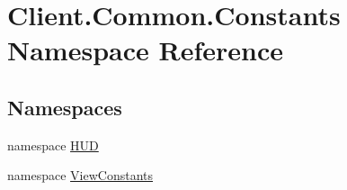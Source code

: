 \hypertarget{namespaceClient_1_1Common_1_1Constants}{}\section{Client.\+Common.\+Constants Namespace Reference}
\label{namespaceClient_1_1Common_1_1Constants}
\subsection*{Namespaces}
\begin{DoxyCompactItemize}
\item 
namespace \hyperlink{namespaceClient_1_1Common_1_1Constants_1_1HUD}{H\+U\+D}
\item 
namespace \hyperlink{namespaceClient_1_1Common_1_1Constants_1_1ViewConstants}{View\+Constants}
\end{DoxyCompactItemize}
